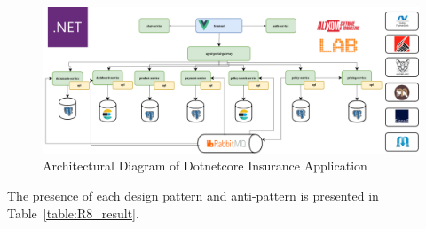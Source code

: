 \documentclass{Configuration_Files/PoliMi3i_thesis}
\begin{document}
\begin{figure}[H]
\centering
\includegraphics[width=1\textwidth]{myImages/R8.png}
\caption{Architectural Diagram of Dotnetcore Insurance Application}
\label{fig:R8_arch}
\end{figure}

The presence of each design pattern and anti-pattern is presented in Table~\ref{table:R8_result}.
\end{document}
